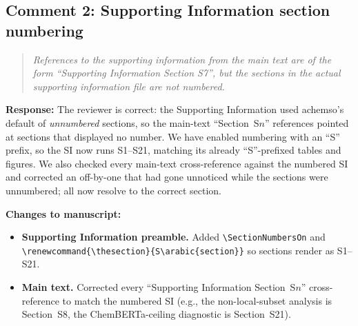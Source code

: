 \documentclass[11pt]{article}
\newenvironment{reviewer}{%
  \begin{quote}\itshape\color{black!70}}{%
  \end{quote}}
\newcommand{\response}[1]{\noindent\textbf{Response:} #1\par\medskip}
\newenvironment{changes}{%
  \noindent\textbf{Changes to manuscript:}
  \begin{itemize}[leftmargin=2em,itemsep=2pt]}{%
  \end{itemize}\medskip}
\begin{document}
\subsection*{Comment 2: Supporting Information section numbering}
\begin{reviewer}
References to the supporting information from the main text are of the form ``Supporting Information Section S7'', but the sections in the actual supporting information file are not numbered.
\end{reviewer}
\response{The reviewer is correct: the Supporting Information used achemso's default of \emph{unnumbered} sections, so the main-text ``Section~S$n$'' references pointed at sections that displayed no number. We have enabled numbering with an ``S'' prefix, so the SI now runs S1--S21, matching its already ``S''-prefixed tables and figures. We also checked every main-text cross-reference against the numbered SI and corrected an off-by-one that had gone unnoticed while the sections were unnumbered; all now resolve to the correct section.}
\begin{changes}
  \item \textbf{Supporting Information preamble.} Added \texttt{\textbackslash SectionNumbersOn} and \texttt{\textbackslash renewcommand\{\textbackslash thesection\}\{S\textbackslash arabic\{section\}\}} so sections render as S1--S21.
  \item \textbf{Main text.} Corrected every ``Supporting Information Section~S$n$'' cross-reference to match the numbered SI (e.g., the non-local-subset analysis is Section~S8, the ChemBERTa-ceiling diagnostic is Section~S21).
\end{changes}
\end{document}
